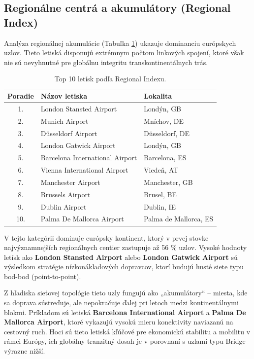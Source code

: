 \subsection{Regionálne centrá a akumulátory (Regional Index)}

Analýza regionálnej akumulácie (Tabuľka \ref{tab:regional_index_results}) ukazuje dominanciu európskych uzlov.
Tieto letiská disponujú extrémnym počtom linkových  spojení, ktoré však nie sú nevyhnutné pre globálnu integritu transkontinentálnych trás.

\begin{table}[h!]
\centering
\small
\begin{tabular}{cll}
\hline
\textbf{Poradie} & \textbf{Názov letiska} & \textbf{Lokalita} \\ \hline
1. & London Stansted Airport & Londýn, GB \\
2. & Munich Airport & Mníchov, DE \\
3. & Düsseldorf Airport & Düsseldorf, DE \\
4. & London Gatwick Airport & Londýn, GB \\
5. & Barcelona International Airport & Barcelona, ES \\
6. & Vienna International Airport & Viedeň, AT \\
7. & Manchester Airport & Manchester, GB \\
8. & Brussels Airport & Brusel, BE \\
9. & Dublin Airport & Dublin, IE \\
10. & Palma De Mallorca Airport & Palma de Mallorca, ES \\ \hline
\end{tabular}
\caption{\centering Top 10 letísk podľa Regional Indexu.}
\label{tab:regional_index_results}
\end{table}

V tejto kategórii dominuje európsky kontinent, ktorý v prvej stovke najvýznamnejších regionálnych centier zastupuje až 56 \% uzlov. Vysoké hodnoty 
letísk ako \textbf{London Stansted Airport} alebo \textbf{London Gatwick Airport} sú výsledkom stratégie nízkonákladových dopravcov, ktorí budujú 
husté siete typu bod-bod (point-to-point). 

Z hľadiska sieťovej topológie tieto uzly fungujú ako „akumulátory“ – miesta, kde sa doprava sústreďuje, ale nepokračuje ďalej pri letoch medzi 
kontinentálnymi blokmi. Príkladom sú letiská \textbf{Barcelona International Airport} a \textbf{Palma De Mallorca Airport}, ktoré vykazujú vysokú 
mieru konektivity naviazanú na cestovný ruch. Hoci sú tieto letiská kľúčové pre ekonomickú stabilitu a mobilitu v rámci Európy, ich globálny tranzitný 
dosah je v porovnaní s uzlami typu Bridge výrazne nižší.


